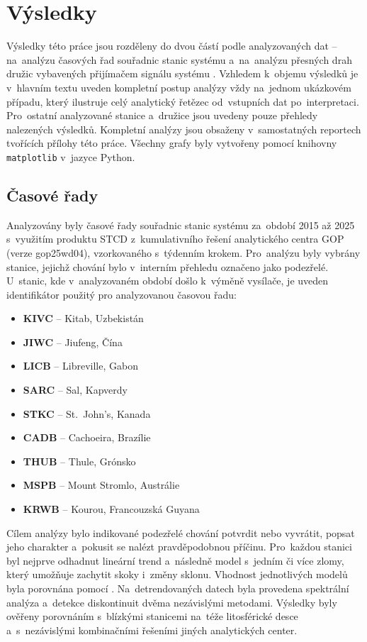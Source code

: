 \chapter{Výsledky}
\label{7-vysledky}

Výsledky této práce jsou rozděleny do dvou částí podle analyzovaných dat -- na~analýzu časových řad souřadnic stanic systému  a~na~analýzu přesných drah družic vybavených přijímačem signálu systému . Vzhledem k~objemu výsledků je v~hlavním textu uveden kompletní postup analýzy vždy na~jednom ukázkovém případu, který ilustruje celý analytický řetězec od~vstupních dat po~interpretaci. Pro~ostatní analyzované stanice a~družice jsou uvedeny pouze přehledy nalezených výsledků. Kompletní analýzy jsou obsaženy v~samostatných reportech tvořících přílohy této práce. Všechny grafy byly vytvořeny pomocí knihovny \texttt{matplotlib} v~jazyce Python.

\section{Časové řady}
\label{sec:casove-rady}

Analyzovány byly časové řady souřadnic stanic systému  za~období 2015 až 2025 s~využitím produktu STCD z~kumulativního řešení analytického centra GOP (verze gop25wd04), vzorkovaného s~týdenním krokem. Pro~analýzu byly vybrány stanice, jejichž chování bylo v~interním přehledu  označeno jako podezřelé. U~stanic, kde v~analyzovaném období došlo k~výměně vysílače, je uveden identifikátor použitý pro analyzovanou časovou řadu:

\begin{itemize}
\item \textbf{KIVC} -- Kitab, Uzbekistán
\item \textbf{JIWC} -- Jiufeng, Čína
\item \textbf{LICB} -- Libreville, Gabon
\item \textbf{SARC} -- Sal, Kapverdy
\item \textbf{STKC} -- St.~John's, Kanada
\item \textbf{CADB} -- Cachoeira, Brazílie
\item \textbf{THUB} -- Thule, Grónsko
\item \textbf{MSPB} -- Mount Stromlo, Austrálie
\item \textbf{KRWB} -- Kourou, Francouzská Guyana
\end{itemize}

Cílem analýzy bylo indikované podezřelé chování potvrdit nebo vyvrátit, popsat jeho charakter a~pokusit se nalézt pravděpodobnou příčinu. Pro~každou stanici byl nejprve odhadnut lineární trend a~následně model s~jedním či více zlomy, který umožňuje zachytit skoky i~změny sklonu. Vhodnost jednotlivých modelů byla porovnána pomocí . Na~detrendovaných datech byla provedena spektrální analýza a~detekce diskontinuit dvěma nezávislými metodami. Výsledky byly ověřeny porovnáním s~blízkými stanicemi na~téže litosférické desce a~s~nezávislými kombinačními řešeními jiných analytických center.

